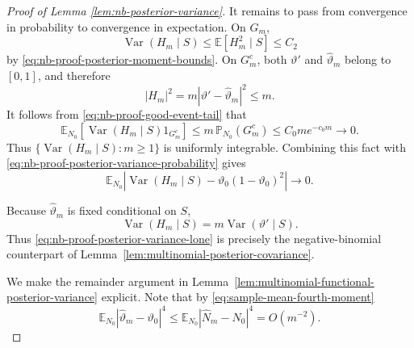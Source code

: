 \documentclass{article}
\theoremstyle{named}
\theoremstyle{named1}
\theoremstyle{plain}
\theoremstyle{remark}
\begin{document}
\begin{proof}[Proof of Lemma \ref{lem:nb-posterior-variance}]
It remains to pass from convergence in probability to convergence in
expectation. On \(G_m\),
\[
    \operatorname{Var}(H_m\mid S)
    \leq
    \mathbb E[H_m^2\mid S]
    \leq C_2
\]
by \eqref{eq:nb-proof-posterior-moment-bounds}. On \(G_m^c\), both
\(\vartheta'\) and \(\widehat\vartheta_m\) belong to \([0,1]\), and
therefore
\[
    |H_m|^2
    =
    m|\vartheta'-\widehat\vartheta_m|^2
    \leq m.
\]
It follows from \eqref{eq:nb-proof-good-event-tail} that
\begin{equation}
    \mathbb E_{N_0}
    \left[
        \operatorname{Var}(H_m\mid S)1_{G_m^c}
    \right]
    \leq
    m\,\mathbb P_{N_0}(G_m^c)\leq
    C_0m e^{-c_0m}
    \rightarrow0.
    \label{eq:nb-proof-bad-event-variance}
\end{equation}
Thus
\(\{\operatorname{Var}(H_m\mid S):m\geq1\}\) is uniformly
integrable. Combining this fact with
\eqref{eq:nb-proof-posterior-variance-probability} gives
\begin{equation}
    \mathbb E_{N_0}
    \left|
        \operatorname{Var}(H_m\mid S)
        -
        \vartheta_0(1-\vartheta_0)^2
    \right|
    \rightarrow0.
    \label{eq:nb-proof-posterior-variance-lone}
\end{equation}

Because \(\widehat\vartheta_m\) is fixed conditional on \(S\),
\[
    \operatorname{Var}(H_m\mid S)
    =
    m\operatorname{Var}(\vartheta'\mid S).
\]
Thus \eqref{eq:nb-proof-posterior-variance-lone} is precisely the
negative-binomial counterpart of
Lemma~\ref{lem:multinomial-posterior-covariance}.


We make the remainder argument in Lemma~\ref{lem:multinomial-functional-posterior-variance} explicit.
Note that by \eqref{eq:sample-mean-fourth-moment}
\[
   \mathbb E_{N_0}
    |\widehat\vartheta_m-\vartheta_0|^4\leq \mathbb E_{N_0}
    |\widehat N_m-N_0|^4
    =
    O(m^{-2}).
\]


\end{proof}
\end{document}
